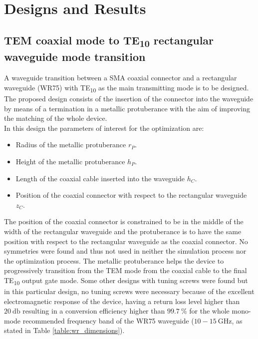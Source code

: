 \documentclass[english,twoside]{article}
\begin{document}
		
	
	\newpage
	\section{Designs and Results}
	\subsection{TEM coaxial mode to TE\textsubscript{10} rectangular waveguide mode transition}
		A waveguide transition between a \ac{SMA} coaxial connector and a rectangular waveguide (\ac{WR}75) with \ac{TE}\textsubscript{10} as the main transmitting mode is to be designed.\\
		
		The proposed design consists of the insertion of the connector into the waveguide by means of a termination in a metallic protuberance with the aim of improving the matching of the whole device.\\
		
		In this design the parameters of interest for the optimization are:
		\begin{itemize}
			\item Radius of the metallic protuberance $r_P$.
			\item Height of the metallic protuberance $h_P$.
			\item Length of the coaxial cable inserted into the waveguide $h_C$.
			\item Position of the coaxial connector with respect to the rectangular waveguide $z_C$. 
		\end{itemize}
		
		The position of the coaxial connector is constrained to be in the middle of the width of the rectangular waveguide and the protuberance is to have the same position with respect to the rectangular waveguide as the coaxial connector. No symmetries were found and thus not used in neither the simulation process nor the optimization process. The metallic protuberance helps the device to progressively transition from the \ac{TEM} mode from the coaxial cable to the final \ac{TE}\textsubscript{10} output gate mode. Some other designs with tuning screws were found but in this particular design, no tuning screws were necessary because of the excellent electromagnetic response of the device, having a return loss level higher than $\SI{20}{\decibel}$ resulting in a conversion efficiency higher than $\SI{99.7}{\percent}$ for the whole mono-mode recommended frequency band of the \ac{WR}75 waveguide ($\num{10}-\SI{15}{\giga\hertz}$, as stated in Table \ref{table:wr_dimensions}).\\
    
\end{document}
